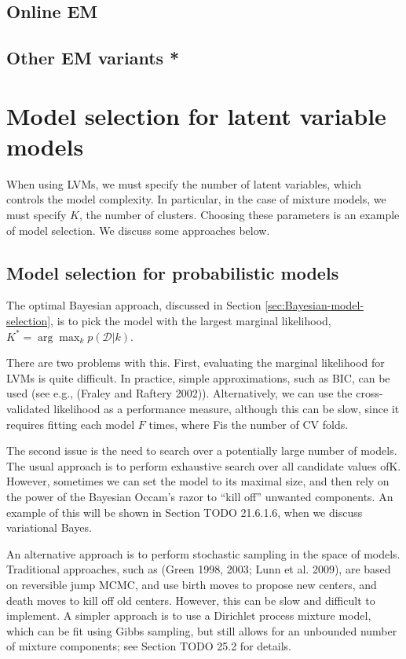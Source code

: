 \subsection{Online EM}


\subsection{Other EM variants *}


\section{Model selection for latent variable models}
When using LVMs, we must specify the number of latent variables, which controls the model complexity. In particular, in the case of mixture models, we must specify $K$, the number of clusters. Choosing these parameters is an example of model selection. We discuss some approaches below.


\subsection{Model selection for probabilistic models}
The optimal Bayesian approach, discussed in Section \ref{sec:Bayesian-model-selection}, is to pick the model with the largest marginal likelihood, $K^*=\arg\max_k p(\mathcal{D}|k)$.

There are two problems with this. First, evaluating the marginal likelihood for LVMs is quite difficult. In practice, simple approximations, such as BIC, can be used (see e.g., (Fraley and Raftery 2002)). Alternatively, we can use the cross-validated likelihood as a performance measure, although this can be slow, since it requires fitting each model $F$ times, where Fis the number of CV folds.

The second issue is the need to search over a potentially large number of models. The usual approach is to perform exhaustive search over all candidate values ofK. However, sometimes we can set the model to its maximal size, and then rely on the power of the Bayesian Occam’s razor to “kill off” unwanted components. An example of this will be shown in Section TODO 21.6.1.6, when we discuss variational Bayes.

An alternative approach is to perform stochastic sampling in the space of models. Traditional approaches, such as (Green 1998, 2003; Lunn et al. 2009), are based on reversible jump MCMC, and use birth moves to propose new centers, and death moves to kill off old centers. However, this can be slow and difficult to implement. A simpler approach is to use a Dirichlet process mixture model, which can be fit using Gibbs sampling, but still allows for an unbounded number of mixture components; see Section TODO 25.2 for details.

